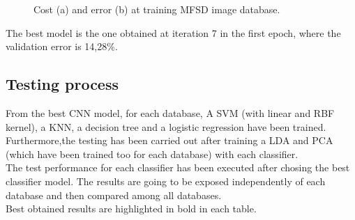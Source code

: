 \begin{figure}[H]
\centering
\caption{Cost (a) and error (b) at training MFSD image database.}
\label{fig:ejecucion2_mfsd_train}
\end{figure}

The best model is the one obtained at iteration 7 in the first epoch, where the validation error is 14,28\%.

\subsection{Testing process}
From the best CNN model, for each database, A SVM (with linear and RBF kernel), a KNN, a decision tree and a logistic regression have been trained. Furthermore,the testing has been carried out after training a LDA and PCA (which have been trained too for each database) with each classifier.\\

The test performance for each classifier has been executed after chosing the best classifier model.  The results are going to be exposed independently of each database and then compared among all databases.\\

Best obtained results are highlighted in bold in each table.\\

